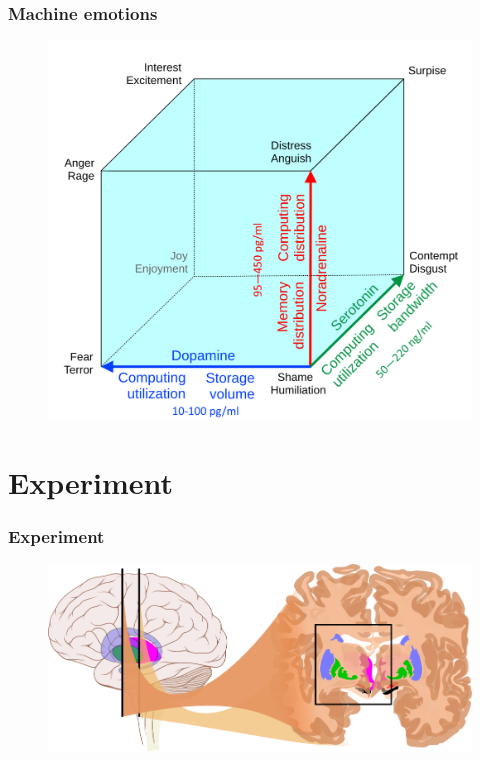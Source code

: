 \documentclass[12pt]{beamer}
\begin{document}

\begin{frame}
\frametitle{Machine emotions}
\begin{figure}
\includegraphics[width=0.8\linewidth]{advanced_cube_weight}
\end{figure}
\end{frame}

\section{Experiment}

\begin{frame}
\frametitle{Experiment}
\begin{figure}
\includegraphics[width=1.0\linewidth]{Basal_ganglia_circuits_cropped}
\end{figure}
\end{frame}

\end{document}
